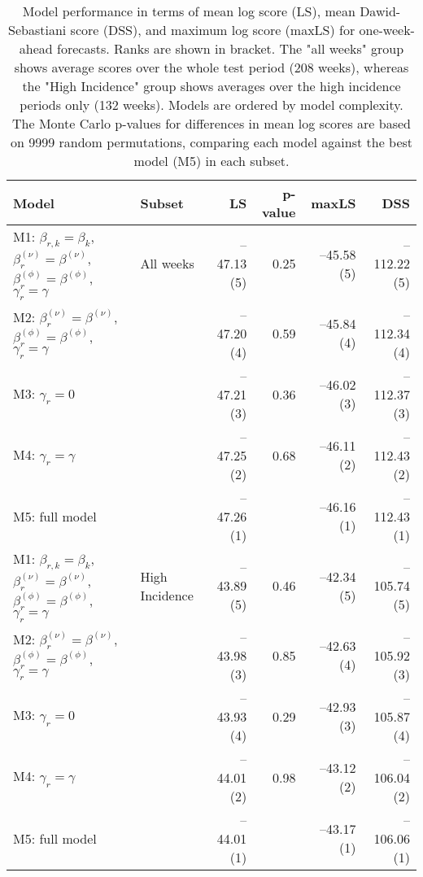 \begin{table}[ht]
\centering
\begingroup\fontsize{9pt}{10pt}\selectfont
\begin{tabular}{ll|rrrr}
  \hline
Model & Subset & LS & p-value & maxLS & DSS \\ 
  \hline
M1: $\beta_{r,k} = \beta_{k}$, $\beta_{r}^{(\nu)} = \beta^{(\nu)}$, $\beta_r^{(\phi)} = \beta^{(\phi)}$, $\gamma_r = \gamma$ & All weeks & --47.13 (5) & 0.25 & --45.58 (5) & --112.22 (5) \\ 
  M2: $\beta_{r}^{(\nu)} = \beta^{(\nu)}$, $\beta_r^{(\phi)} = \beta^{(\phi)}$, $\gamma_r = \gamma$ &  & --47.20 (4) & 0.59 & --45.84 (4) & --112.34 (4) \\ 
  M3: $\gamma_r = 0$ &  & --47.21 (3) & 0.36 & --46.02 (3) & --112.37 (3) \\ 
  M4: $\gamma_r = \gamma$ &  & --47.25 (2) & 0.68 & --46.11 (2) & --112.43 (2) \\ 
  M5: full model &  & --47.26 (1) &  & --46.16 (1) & --112.43 (1) \\ 
   \hline
M1: $\beta_{r,k} = \beta_{k}$, $\beta_{r}^{(\nu)} = \beta^{(\nu)}$, $\beta_r^{(\phi)} = \beta^{(\phi)}$, $\gamma_r = \gamma$ & High Incidence & --43.89 (5) & 0.46 & --42.34 (5) & --105.74 (5) \\ 
  M2: $\beta_{r}^{(\nu)} = \beta^{(\nu)}$, $\beta_r^{(\phi)} = \beta^{(\phi)}$, $\gamma_r = \gamma$ &  & --43.98 (3) & 0.85 & --42.63 (4) & --105.92 (3) \\ 
  M3: $\gamma_r = 0$ &  & --43.93 (4) & 0.29 & --42.93 (3) & --105.87 (4) \\ 
  M4: $\gamma_r = \gamma$ &  & --44.01 (2) & 0.98 & --43.12 (2) & --106.04 (2) \\ 
  M5: full model &  & --44.01 (1) &  & --43.17 (1) & --106.06 (1) \\ 
   \hline
\end{tabular}
\endgroup
\caption{Model performance in terms of mean log score (LS),
             mean Dawid-Sebastiani score (DSS), and maximum log score (maxLS)
             for one-week-ahead forecasts.
             Ranks are shown in bracket.
             The "all weeks" group shows average scores over the
             whole test period (208 weeks),
             whereas the "High Incidence" group shows
             averages over the high incidence periods only (132 weeks).
             Models are ordered by model complexity.
             The Monte Carlo p-values for differences in mean log scores
             are based on 9999 random permutations,
             comparing each model against the best model (M5) in each subset.} 
\label{tab:forecast}
\end{table}
